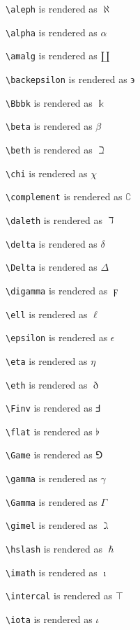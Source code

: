 \texttt{\textbackslash aleph} is rendered as $\aleph$


\texttt{\textbackslash alpha} is rendered as $\alpha$


\texttt{\textbackslash amalg} is rendered as $\amalg$


\texttt{\textbackslash backepsilon} is rendered as $\backepsilon$


\texttt{\textbackslash Bbbk} is rendered as $\Bbbk$


\texttt{\textbackslash beta} is rendered as $\beta$


\texttt{\textbackslash beth} is rendered as $\beth$


\texttt{\textbackslash chi} is rendered as $\chi$


\texttt{\textbackslash complement} is rendered as $\complement$


\texttt{\textbackslash daleth} is rendered as $\daleth$


\texttt{\textbackslash delta} is rendered as $\delta$


\texttt{\textbackslash Delta} is rendered as $\Delta$


\texttt{\textbackslash digamma} is rendered as $\digamma$


\texttt{\textbackslash ell} is rendered as $\ell$


\texttt{\textbackslash epsilon} is rendered as $\epsilon$


\texttt{\textbackslash eta} is rendered as $\eta$


\texttt{\textbackslash eth} is rendered as $\eth$


\texttt{\textbackslash Finv} is rendered as $\Finv$


\texttt{\textbackslash flat} is rendered as $\flat$


\texttt{\textbackslash Game} is rendered as $\Game$


\texttt{\textbackslash gamma} is rendered as $\gamma$


\texttt{\textbackslash Gamma} is rendered as $\Gamma$


\texttt{\textbackslash gimel} is rendered as $\gimel$


\texttt{\textbackslash hslash} is rendered as $\hslash$


\texttt{\textbackslash imath} is rendered as $\imath$


\texttt{\textbackslash intercal} is rendered as $\intercal$


\texttt{\textbackslash iota} is rendered as $\iota$


